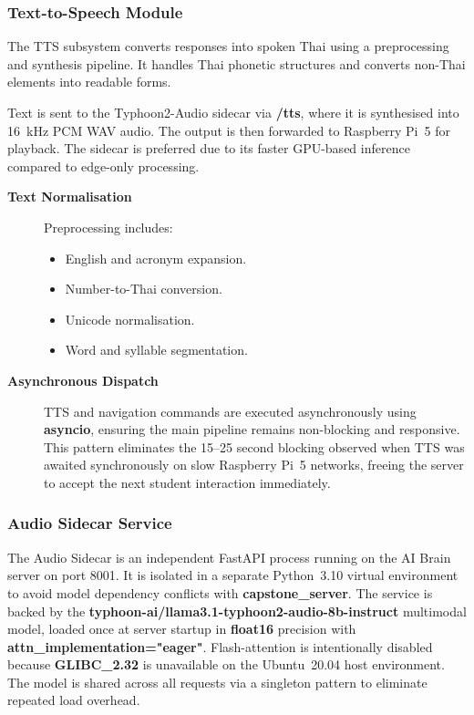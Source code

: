 \subsubsection{Text-to-Speech Module}

The TTS subsystem converts responses into spoken Thai using a preprocessing and synthesis pipeline. It handles Thai phonetic structures and converts non-Thai elements into readable forms.

Text is sent to the Typhoon2-Audio sidecar via \textbf{/tts}, where it is synthesised into 16~kHz PCM WAV audio. The output is then forwarded to Raspberry Pi~5 for playback. The sidecar is preferred due to its faster GPU-based inference compared to edge-only processing.

\begin{description}
    \item[\textbf{Text Normalisation}] Preprocessing includes:
    \begin{itemize}
        \item English and acronym expansion.
        \item Number-to-Thai conversion.
        \item Unicode normalisation.
        \item Word and syllable segmentation.
    \end{itemize}

    \item[\textbf{Asynchronous Dispatch}] TTS and navigation commands are executed asynchronously using \textbf{asyncio}, ensuring the main pipeline remains non-blocking and responsive. This pattern eliminates the 15--25 second blocking observed when TTS was awaited synchronously on slow Raspberry Pi~5 networks, freeing the server to accept the next student interaction immediately.
\end{description}

\subsubsection{Audio Sidecar Service}

The Audio Sidecar is an independent FastAPI process running on the AI Brain server on port 8001. It is isolated in a separate Python~3.10 virtual environment to avoid model dependency conflicts with \textbf{capstone\_server}. The service is backed by the \textbf{typhoon-ai/llama3.1-typhoon2-audio-8b-instruct} multimodal model, loaded once at server startup in \textbf{float16} precision with \textbf{attn\_implementation="eager"}. Flash-attention is intentionally disabled because \textbf{GLIBC\_2.32} is unavailable on the Ubuntu~20.04 host environment. The model is shared across all requests via a singleton pattern to eliminate repeated load overhead.

